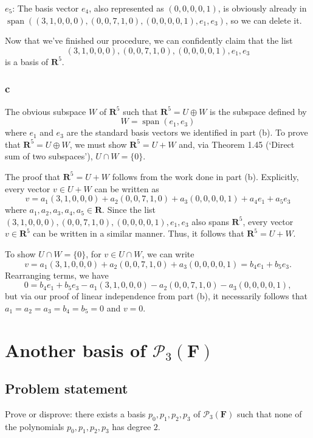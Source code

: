 \documentclass{article}
\begin{document}
$e_5$: The basis vector $e_4$, also represented as $(0,0,0,0,1)$, is obviously already in $\operatorname{span}((3,1,0,0,0),(0,0,7,1,0),(0,0,0,0,1),e_1,e_3)$, so we can delete it.

Now that we've finished our procedure, we can confidently claim that the list 
\[(3,1,0,0,0),(0,0,7,1,0),(0,0,0,0,1),e_1,e_3\]
is a basis of $\mathbf{R}^5$.

\subsubsection*{c}
The obvious subspace $W$ of $\mathbf{R}^5$ such that $\mathbf{R}^5=U\oplus W$ is the subspace defined by
\[W=\operatorname{span}(e_1,e_3)\]
where $e_1$ and $e_3$ are the standard basis vectors we identified in part (b). 
To prove that $\mathbf{R}^5=U\oplus W$, we must show $\mathbf{R}^5=U+W$ and, via Theorem 1.45 (`Direct sum of two subspaces'), $U\cap W=\{0\}$. 

The proof that $\mathbf{R}^5=U+W$ follows from the work done in part (b). 
Explicitly, every vector $v\in U+W$ can be written as
\[v=a_1(3,1,0,0,0)+a_2(0,0,7,1,0)+a_3(0,0,0,0,1)+a_4e_1+a_5e_3\]
where $a_1,a_2,a_3,a_4,a_5\in\mathbf{R}$. 
Since the list\newline $(3,1,0,0,0),(0,0,7,1,0),(0,0,0,0,1),e_1,e_3$ also spans $\mathbf{R}^5$, every vector $v\in\mathbf{R}^5$ can be written in a similar manner. 
Thus, it follows that $\mathbf{R}^5=U+W$.

To show $U\cap W=\{0\}$, for $v\in U\cap W$, we can write
\[v=a_1(3,1,0,0,0)+a_2(0,0,7,1,0)+a_3(0,0,0,0,1)=b_4e_1+b_5e_3.\]
Rearranging terms, we have
\[0=b_4e_1+b_5e_3-a_1(3,1,0,0,0)-a_2(0,0,7,1,0)-a_3(0,0,0,0,1),\]
but via our proof of linear independence from part (b), it necessarily follows that $a_1=a_2=a_3=b_4=b_5=0$ and $v=0$.

\clearpage

\renewcommand{\thesection}{5}
\section{Another basis of $\mathcal{P}_3(\mathbf{F})$}
\subsection*{Problem statement}
Prove or disprove: there exists a basis $p_0,p_1,p_2,p_3$ of $\mathcal{P}_3(\mathbf{F})$ such that none of the polynomials $p_0,p_1,p_2,p_3$ has degree $2$.
\end{document}
